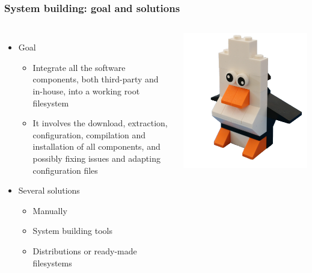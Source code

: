 \begin{frame}
  \frametitle{System building: goal and solutions}
  \begin{columns}[T]
    \begin{itemize}
    \item Goal
      \begin{itemize}
      \item Integrate all the software components, both third-party and
        in-house, into a working root filesystem
      \item It involves the download, extraction, configuration,
        compilation and installation of all components, and possibly
        fixing issues and adapting configuration files
      \end{itemize}
    \item Several solutions
      \begin{itemize}
      \item Manually
      \item System building tools
      \item Distributions or ready-made filesystems
      \end{itemize}
    \end{itemize}
    \includegraphics[width=\textwidth]{slides/sysdev-embedded-linux/lego-penguin.png}
  \end{columns}
\end{frame}

